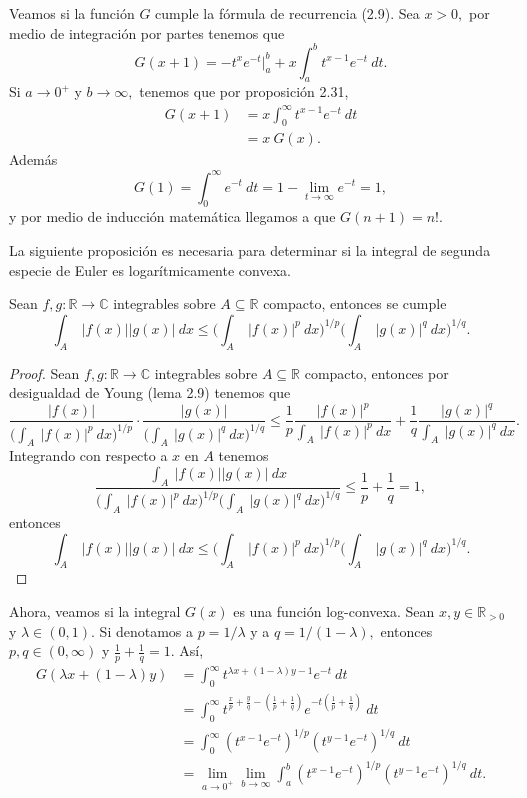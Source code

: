 Veamos si la función $G$ cumple la fórmula de recurrencia (2.9). Sea $x > 0,$ por medio de integración por partes tenemos que $$G(x+1) = -t^xe^{-t}\bigg|_a^b + x\int_{a}^{b}t^{x-1}e^{-t}\ dt.$$ Si $a \rightarrow 0^+$ y $b \rightarrow \infty,$ tenemos que por proposición 2.31, 
\begin{align*}
	G(x+1) &= x\int_{0}^{\infty}t^{x-1}e^{-t}\ dt\\
	&= x\ G(x).
\end{align*}
Además $$G(1) = \int_{0}^{\infty}e^{-t}\ dt = 1-\lim_{t \rightarrow \infty}e^{-t} = 1,$$ y por medio de inducción matemática llegamos a que $G(n+1) = n!.$

La siguiente proposición es necesaria para determinar si la integral de segunda especie de Euler es logarítmicamente convexa.
\begin{proposition}
	Sean $f,g: \mathbb{R} \rightarrow \mathbb{C}$ integrables sobre $A \subseteq \mathbb{R}$ compacto, entonces se cumple $$\int_{A}\ |f(x)||g(x)|\ dx \leq \bigg(\int_{A}\ |f(x)|^p\ dx \bigg)^{1/p}\bigg(\int_{A}\ |g(x)|^q\ dx\bigg)^{1/q}.$$
\end{proposition}
\begin{proof}
	Sean $f,g: \mathbb{R} \rightarrow \mathbb{C}$ integrables sobre $A \subseteq \mathbb{R}$ compacto, entonces por desigualdad de Young (lema 2.9) tenemos que $$\frac{|f(x)|}{\big(\int_{A}\ |f(x)|^p\ dx\big)^{1/p}}\cdot \frac{|g(x)|}{\big(\int_{A}\ |g(x)|^q\ dx\big)^{1/q}} \leq \frac{1}{p}\frac{|f(x)|^p}{\int_{A}\ |f(x)|^p\ dx}+\frac{1}{q}\frac{|g(x)|^q}{\int_{A}\ |g(x)|^q\ dx}.$$
	Integrando con respecto a $x$ en $A$ tenemos $$\frac{\int_{A}\ |f(x)||g(x)|\ dx}{\big(\int_{A}\ |f(x)|^p\ dx\big)^{1/p}\big(\int_{A}\ |g(x)|^q\ dx\big)^{1/q}} \leq \frac{1}{p}+\frac{1}{q} = 1,$$ entonces $$\int_{A}\ |f(x)||g(x)|\ dx \leq \bigg(\int_{A}\ |f(x)|^p\ dx\bigg)^{1/p}\bigg(\int_{A}\ |g(x)|^q\ dx\bigg)^{1/q}.$$
\end{proof}
Ahora, veamos si la integral $G(x)$ es una función log-convexa. Sean $x,y \in \mathbb{R}_{>0}$ y $\lambda \in (0,1).$ Si denotamos a $p = 1/\lambda$ y a $q = 1/(1-\lambda),$ entonces $p,q \in (0,\infty)$ y $\frac{1}{p}+\frac{1}{q} = 1.$ Así, 
\begin{align*}
	G(\lambda x + (1-\lambda)y) &= \int_{0}^{\infty}t^{\lambda x+(1-\lambda)y-1}e^{-t}\ dt\\
	&= \int_{0}^{\infty}t^{\frac{x}{p}+\frac{y}{q}-(\frac{1}{p}+\frac{1}{q})}e^{-t(\frac{1}{p}+\frac{1}{q})}\ dt\\
	&= \int_{0}^{\infty}(t^{x-1}e^{-t})^{1/p}(t^{y-1}e^{-t})^{1/q}\ dt\\
	&= \lim_{a \rightarrow 0^+}\lim_{b \rightarrow \infty}\int_{a}^{b}(t^{x-1}e^{-t})^{1/p}(t^{y-1}e^{-t})^{1/q}\ dt.
\end{align*}
